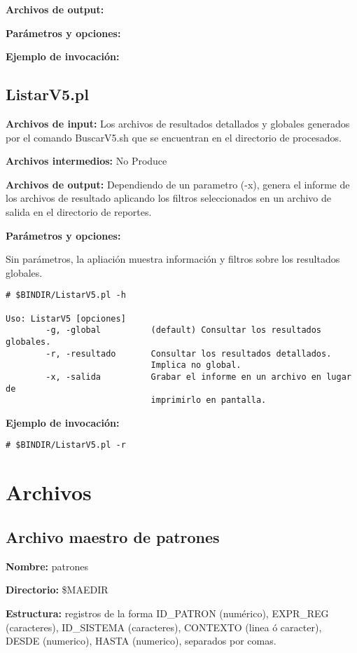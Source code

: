 \documentclass[a4paper,12pt]{article}
\begin{document}
{\bf Archivos de output:}

{\bf Parámetros y opciones:}

{\bf Ejemplo de invocación:}


\subsection{  ListarV5.pl }

{\bf Archivos de input:} Los archivos de resultados detallados y globales generados por el comando BuscarV5.sh que se encuentran en el directorio de procesados.

{\bf Archivos intermedios:} No Produce

{\bf Archivos de output:} Dependiendo de un parametro (-x), genera el informe de los archivos de resultado aplicando los filtros seleccionados en un archivo de salida en el directorio de reportes.

{\bf Parámetros y opciones:}

Sin parámetros, la apliación muestra información y filtros sobre los resultados globales.

\begin{verbatim}
# $BINDIR/ListarV5.pl -h

Uso: ListarV5 [opciones]
        -g, -global          (default) Consultar los resultados globales.
        -r, -resultado       Consultar los resultados detallados.
                             Implica no global.
        -x, -salida          Grabar el informe en un archivo en lugar de
                             imprimirlo en pantalla.
\end{verbatim}

{\bf Ejemplo de invocación:}

\begin{verbatim}
# $BINDIR/ListarV5.pl -r
\end{verbatim}

\section{Archivos}

\subsection{Archivo maestro de patrones}

{\bf Nombre:} patrones

{\bf Directorio:} \$MAEDIR

{\bf Estructura:} registros de la forma ID\_PATRON (numérico), EXPR\_REG (caracteres), ID\_SISTEMA (caracteres), CONTEXTO (linea ó caracter), DESDE (numerico), HASTA (numerico), separados por comas.
\end{document}
